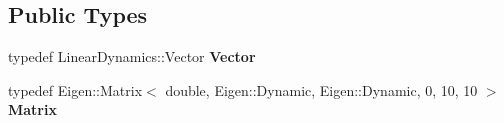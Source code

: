 \subsection*{Public Types}
\begin{DoxyCompactItemize}
\item 
typedef Linear\+Dynamics\+::\+Vector {\bfseries Vector}\hypertarget{classmct_1_1LinearDynamicsWithAccelerationConstraint_a9f31f3ecc820198a01eb0fc78c4dfb75}{}\label{classmct_1_1LinearDynamicsWithAccelerationConstraint_a9f31f3ecc820198a01eb0fc78c4dfb75}

\item 
typedef Eigen\+::\+Matrix$<$ double, Eigen\+::\+Dynamic, Eigen\+::\+Dynamic, 0, 10, 10 $>$ {\bfseries Matrix}\hypertarget{classmct_1_1LinearDynamicsWithAccelerationConstraint_a5a74321eebcdddebde9083145feb996f}{}\label{classmct_1_1LinearDynamicsWithAccelerationConstraint_a5a74321eebcdddebde9083145feb996f}

\end{DoxyCompactItemize}
